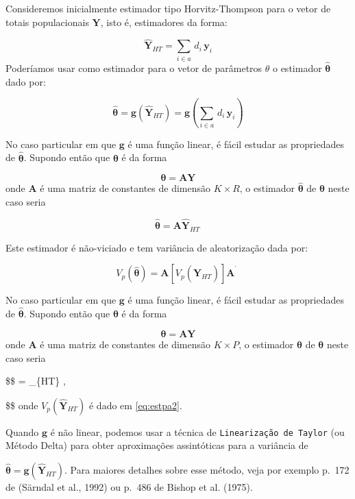 \documentclass[
  12pt,
  brazilian,
]{book}
\theoremstyle{definition}
\theoremstyle{definition}
\theoremstyle{definition}
\theoremstyle{definition}
\theoremstyle{remark}
\begin{document}
Consideremos inicialmente estimador tipo Horvitz-Thompson para o vetor de totais populacionais \(\mathbf{Y}\), isto é, estimadores da forma:

\[
\widehat{\mathbf{Y}}_{HT} = \sum_{i\in a} \, d_i \, \mathbf{y}_{i}  
\]
Poderíamos usar como estimador para o vetor de parâmetros \(\theta\) o estimador \(\mathbf{\widehat{\theta}}\) dado por:

\[
\mathbf{\widehat{\theta}} = \mathbf{g} \left( \widehat{ \mathbf{Y}}_{HT} \right) = \mathbf{g} \left(\sum_{i\in a} \, d_i \, \mathbf{y}_{i} \right)  
\]

No caso particular em que \(\mathbf{g}\) é uma função linear, é fácil estudar as propriedades de \(\mathbf{\widehat{\theta}}\). Supondo então que \(\mathbf{\theta}\) é da forma

\[
\mathbf{\theta} = \mathbf{A Y}  
\]
onde \(\mathbf{A}\) é uma matriz de constantes de dimensão \(K \times R\), o estimador
\(\mathbf{\widehat{\theta}}\) de \(\mathbf{\theta}\) neste caso seria

\[
\mathbf{\widehat{\theta}} = \mathbf{A \widehat{Y}}_{HT} \,
\]

Este estimador é não-viciado e tem variância de aleatorização dada por:

\[
V_{p}\left( \mathbf{\widehat{\theta}} \right) = \mathbf{A} \left[ V_{p} \left( \mathbf{\widehat{Y}}_{HT} \right) \right] \mathbf{A}^{^{\prime }} \,\,
\]

No caso particular em que \(\mathbf{g}\) é uma função linear, é fácil estudar as propriedades de \(\mathbf{\widehat{\theta}}\). Supondo então que \(\mathbf{\theta}\) é da forma

\[
\mathbf{\theta} = \mathbf{AY}  
\]
onde \(\mathbf{A}\) é uma matriz de constantes de dimensão \(K \times P\), o estimador
\(\mathbf{\widehat{\theta}}\) de \(\mathbf{\theta}\) neste caso seria

\$\$
\mathbf{\widehat{\theta}} = \_\{HT\} ,

\$\$
onde \(V_{p} \left( \mathbf{\widehat{Y}}_{HT}\right)\) é dado em \eqref{eq:estpa2}.

Quando \(\mathbf{g}\) é não linear, podemos usar a técnica de \texttt{Linearização\ de\ Taylor} (ou Método Delta) para obter aproximações assintóticas para a variância de

\(\mathbf{ \widehat{\theta}} = \mathbf{g} \left( \widehat{\mathbf{Y}}_{HT}\right)\). Para maiores detalhes sobre esse método, veja por exemplo p.~172 de (Särndal et al., 1992) ou p.~486 de Bishop et al. (1975).
\end{document}
